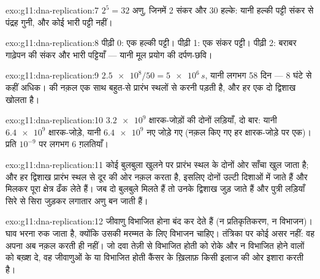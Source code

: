 \begin{solution}{exo:g11:dna-replication:7}
$2^5 = 32$ अणु, जिनमें 2 संकर और 30 हल्के: यानी हल्की पट्टी संकर से
पंद्रह गुनी, और कोई भारी पट्टी नहीं।
\end{solution}

\begin{solution}{exo:g11:dna-replication:8}
पीढ़ी 0: एक हल्की पट्टी। पीढ़ी 1: एक संकर पट्टी। पीढ़ी 2: बराबर गाढ़ेपन
की संकर और भारी पट्टियाँ --- यानी मूल प्रयोग की दर्पण-छवि।
\end{solution}

\begin{solution}{exo:g11:dna-replication:9}
$\num{2.5e8}/50 = \num{5e6}\,\unit{s}$, यानी लगभग 58 दिन --- 8 घंटे से
कहीं अधिक।  की नक़ल एक साथ बहुत-से प्रारंभ स्थलों से करनी पड़ती
है, और हर एक दो द्विशाख खोलता है।
\end{solution}

\begin{solution}{exo:g11:dna-replication:10}
$\num{3.2e9}$ क्षारक-जोड़ों की दोनों लड़ियाँ, दो बार: यानी $\num{6.4e9}$
क्षारक-जोड़े, यानी $\num{6.4e9}$ नए  जोड़े गए (नक़ल किए गए
हर क्षारक-जोड़े पर एक)। प्रति  $10^{-9}$ पर लगभग 6
ग़लतियाँ।
\end{solution}

\begin{solution}{exo:g11:dna-replication:11}
कोई बुलबुला खुलने पर प्रारंभ स्थल के दोनों ओर साँचा खुल जाता है; और हर
द्विशाख प्रारंभ स्थल से दूर की ओर नक़ल करता है, इसलिए दोनों उल्टी दिशाओं
में जाते हैं और मिलकर पूरा क्षेत्र ढँक लेते हैं। जब दो बुलबुले मिलते हैं
तो उनके द्विशाख जुड़ जाते हैं और पुत्री लड़ियाँ सिरे से सिरा जुड़कर
लगातार अणु बन जाती हैं।
\end{solution}

\begin{solution}{exo:g11:dna-replication:12}
जीवाणु विभाजित होना बंद कर देते हैं (न प्रतिकृतिकरण, न विभाजन)। घाव भरना
रुक जाता है, क्योंकि उसकी मरम्मत के लिए  विभाजन चाहिए। तंत्रिका
 पर कोई असर नहीं: वह अपना  अब नक़ल करती ही नहीं। जो दवा तेज़ी से
विभाजित होती  को रोके और न विभाजित होने वालों को बख़्श दे, वह
जीवाणुओं के या विभाजित होती कैंसर  के ख़िलाफ़ किसी इलाज की ओर
इशारा करती है।
\end{solution}

